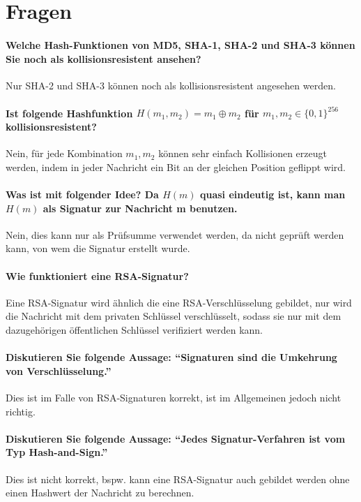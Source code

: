 \documentclass[a4paper, 11pt, accentcolor = tud3b]{tudreport}
\begin{document}
        \section{Fragen}
				\paragraph{Welche Hash-Funktionen von MD5, SHA-1, SHA-2 und SHA-3 können Sie noch als kollisionsresistent ansehen?}
				Nur SHA-2 und SHA-3 können noch als kollisionsresistent angesehen werden.
				
				\paragraph{Ist folgende Hashfunktion \( H(m_1, m_2) = m_1 \oplus m_2 \) für \( m_1, m_2 \in \{0, 1\}^{256} \) kollisionsresistent?}
				Nein, für jede Kombination \( m_1, m_2 \) können sehr einfach Kollisionen erzeugt werden, indem in jeder Nachricht ein Bit an der gleichen Position geflippt wird.
				
				\paragraph{Was ist mit folgender Idee? Da \(H(m)\) quasi eindeutig ist, kann man \(H(m)\) als Signatur zur Nachricht m benutzen.}
				Nein, dies kann nur als Prüfsumme verwendet werden, da nicht geprüft werden kann, von wem die Signatur erstellt wurde.
				
				\paragraph{Wie funktioniert eine RSA-Signatur?}
				Eine RSA-Signatur wird ähnlich die eine RSA-Verschlüsselung gebildet, nur wird die Nachricht mit dem privaten Schlüssel verschlüsselt, sodass sie nur mit dem dazugehörigen öffentlichen Schlüssel verifiziert werden kann.
				
				\paragraph{Diskutieren Sie folgende Aussage: \enquote{Signaturen sind die Umkehrung von Verschlüsselung.}}
				Dies ist im Falle von RSA-Signaturen korrekt, ist im Allgemeinen jedoch nicht richtig.
				
				\paragraph{Diskutieren Sie folgende Aussage: \enquote{Jedes Signatur-Verfahren ist vom Typ Hash-and-Sign.}}
				Dies ist nicht korrekt, bspw. kann eine RSA-Signatur auch gebildet werden ohne einen Hashwert der Nachricht zu berechnen.
				
\end{document}
